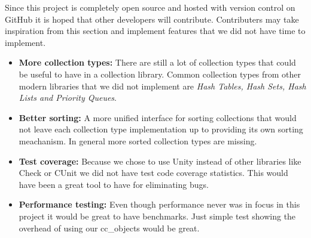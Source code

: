 \documentclass[table]{ituthesis}
\begin{document}
			Since this project is completely open source and hosted with version control on GitHub it is hoped that other developers will contribute. Contributers may take inspiration from this section and implement features that we did not have time to implement.
			
			\begin{itemize}
				\item \textbf{More collection types:} There are still a lot of collection types that could be useful to have in a collection library. Common collection types from other modern libraries that we did not implement are \textit{Hash Tables, Hash Sets, Hash Lists and Priority Queues}.
				\item \textbf{Better sorting:} A more unified interface for sorting collections that would not leave each collection type implementation up to providing its own sorting meachanism. In general more sorted collection types are missing.
				\item \textbf{Test coverage:} Because we chose to use Unity instead of other libraries like Check or CUnit we did not have test code coverage statistics. This would have been a great tool to have for eliminating bugs.
				\item \textbf{Performance testing:} Even though performance never was in focus in this project it would be great to have benchmarks. Just simple test showing the overhead of using our cc\_objects would be great.
			\end{itemize}

\end{document}
